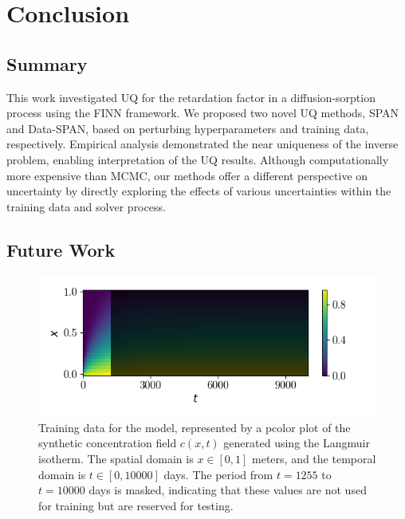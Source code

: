 \section{Conclusion}
\subsection{Summary}
This work investigated UQ for the retardation factor in a diffusion-sorption process using the FINN framework. We proposed two novel UQ methods, SPAN and Data-SPAN, based on perturbing hyperparameters and training data, respectively. Empirical analysis demonstrated the near uniqueness of the inverse problem, enabling interpretation of the UQ results. Although computationally more expensive than MCMC, our methods offer a different perspective on uncertainty by directly exploring the effects of various uncertainties within the training data and solver process.

\subsection{Future Work}






\begin{figure}[h]
    \centering
    \includegraphics{figs/c_diss_field_full_black_test.png}
    \caption{Training data for the model, represented by a pcolor plot of the synthetic concentration field $c(x,t)$ generated using the Langmuir isotherm. The spatial domain is $x \in [0, 1]$ meters, and the temporal domain is $t \in [0, 10000]$ days. The period from $t = 1255$ to $t = 10000$ days is masked, indicating that these values are not used for training but are reserved for testing.}
    \label{fig:c_diss_field_full_black_test}
\end{figure}